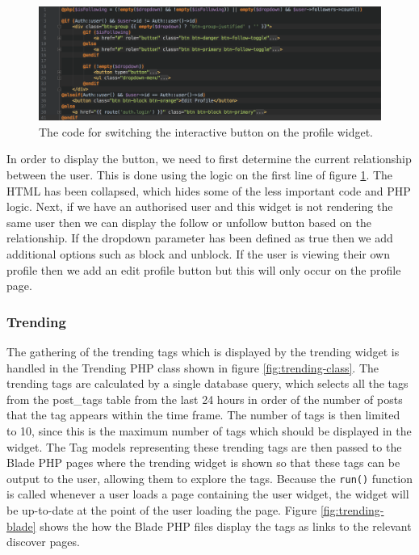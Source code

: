 \begin{figure}[H]
	\centering
	\includegraphics[width=\textwidth]{Images/Implementation/UI/Widgets/Profile_Follow}
	\caption{The code for switching the interactive button on the profile widget.}
	\label{fig:Profile_Follow}
\end{figure}

In order to display the button, we need to first determine the current relationship between the user. This is done using the logic on the first line of figure \ref{fig:Profile_Follow}. The HTML has been collapsed, which hides some of the less important code and PHP logic. Next, if we have an authorised user and this widget is not rendering the same user then we can display the follow or unfollow button based on the relationship. If the dropdown parameter has been defined as true then we add additional options such as block and unblock. If the user is viewing their own profile then we add an edit profile button but this will only occur on the profile page.

\subsubsection{Trending}
The gathering of the trending tags which is displayed by the trending widget is handled in the Trending PHP class shown in figure \ref{fig:trending-class}. The trending tags are calculated by a single database query, which selects all the tags from the post\_tags table from the last 24 hours in order of the number of posts that the tag appears within the time frame. The number of tags is then limited to 10, since this is the maximum number of tags which should be displayed in the widget. The Tag models representing these trending tags are then passed to the Blade PHP pages where the trending widget is shown so that these tags can be output to the user, allowing them to explore the tags. Because the \texttt{run()} function is called whenever a user loads a page containing the user widget, the widget will be up-to-date at the point of the user loading the page. Figure \ref{fig:trending-blade} shows the how the Blade PHP files display the tags as links to the relevant discover pages.

